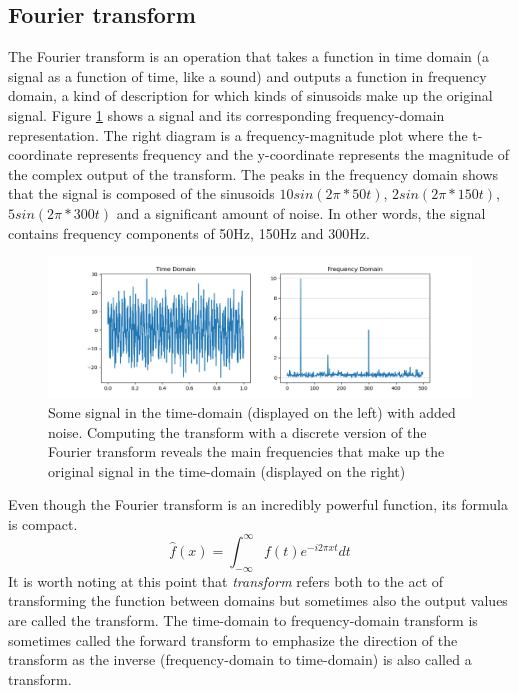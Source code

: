 \subsection{Fourier transform} 
The Fourier transform is an operation that takes a function in time domain (a signal as a function of time, like a sound) and outputs a function in frequency domain, a kind of description for which kinds of sinusoids make up the original signal. Figure \ref{fig:transform} shows a signal and its corresponding frequency-domain representation. The right diagram is a frequency-magnitude plot where the t-coordinate represents frequency and the y-coordinate represents the magnitude of the complex output of the transform. The peaks in the frequency domain shows that the signal is composed of the sinusoids $10sin(2\pi * 50t)$, $2sin(2\pi * 150t)$, $5sin(2\pi * 300t)$ and a significant amount of noise. In other words, the signal contains frequency components of 50Hz, 150Hz and 300Hz. 

\begin{figure}[ht]
    \centering
    \includegraphics[width=\textwidth]{./images/transform.png}
    \caption{Some signal in the time-domain (displayed on the left) with added noise. Computing the transform with a discrete version of the Fourier transform reveals the main frequencies that make up the original signal in the time-domain (displayed on the right)\label{fig:transform}}
\end{figure}

Even though the Fourier transform is an incredibly powerful function, its formula is compact. 
$$\hat{f}(x) = \int_{-\infty}^{\infty} f(t)e^{-i2\pi x t} dt$$
It is worth noting at this point that \textit{transform} refers both to the act of transforming the function between domains but sometimes also the output values are called the transform. The time-domain to frequency-domain transform is sometimes called the forward transform to emphasize the direction of the transform as the inverse (frequency-domain to time-domain) is also called a transform.


